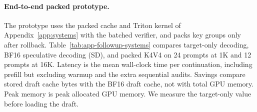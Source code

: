 \documentclass{article}
\begin{document}
\paragraph{End-to-end packed prototype.}
The prototype uses the packed cache and Triton kernel of Appendix~\ref{app:systems} with the
batched verifier, and packs key groups only after rollback.
Table~\ref{tab:app-followup-systems} compares target-only decoding, BF16
speculative decoding (SD), and packed K4V4 on 24 prompts at 1K and 12 prompts
at 16K. Latency is the mean wall-clock time per continuation, including prefill
but excluding warmup and the extra sequential audits. Savings compare stored
draft cache bytes with the BF16 draft cache, not with total GPU memory. Peak
memory is peak allocated GPU memory. We measure the target-only value before
loading the draft.

\begin{table}[ht]
  \centering
  \small
  \caption{End-to-end prototype with 256-token continuations at batch size one.
  $\Delta$ is the paired latency increase over BF16 SD with a 95\% CI. ``Exact''
  counts outputs that equal target-only greedy decoding.}
  \label{tab:app-followup-systems}
\end{table}
\end{document}
